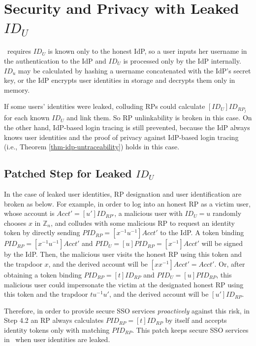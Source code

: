 \appendix

\section{Security and Privacy with Leaked $ID_U$}
\label{sp-leak-uid}
\usso\ requires $ID_U$ is known only to the honest IdP,
so a user inputs her username in the authentication to the IdP and $ID_U$ is processed only by the IdP internally.
$ID_u$ may be calculated by hashing a username concatenated with the IdP's secret key, or the IdP encrypts user identities in storage and decrypts them only in memory.

If some users' identities were leaked,
    colluding RPs could calculate $[ID_U]ID_{RP_j}$ for each known $ID_U$ and link them.
So RP unlinkability is broken in this case.
On the other hand, IdP-based login tracing is still prevented,
    because the IdP always knows user identities and the proof of privacy against IdP-based login tracing (i.e., Theorem \ref{thm-idp-untraceability}) holds in this case.

\subsection{Patched Step for Leaked $ID_U$}
In the case of leaked user identities,
RP designation and user identification are broken as below.
For example, in order to log into an honest RP as a victim user, whose account is $Acct' = [u']ID_{RP'}$,
    a malicious user with $ID_U = u$ randomly chooses $x$ in $\mathbb{Z}_n$,
    and colludes with some malicious RP to request an identity token by directly sending $PID_{RP} = [x^{-1}u^{-1}]Acct'$ to the IdP.
A token binding $PID_{RP} = [x^{-1}u^{-1}]Acct'$ and $PID_U = [u]PID_{RP} = [x^{-1}]Acct'$ will be signed by the IdP.
Then, the malicious user visits the honest RP using this token and the trapdoor $x$,
    and the derived account will be $[xx^{-1}]Acct'=Acct'$.
Or, after obtaining a token binding $PID_{RP} = [t]ID_{RP}$ and $PID_U = [u]PID_{RP}$,
    this malicious user could impersonate the victim at the designated honest RP
     using this token and the trapdoor $tu^{-1}u'$, and the derived account will be $[u']ID_{RP}$.

Therefore, in order to provide secure SSO services \emph{proactively} against this risk,
     in Step 4.2 an RP always calculates $PID_{RP} = [t]ID_{RP}$ by itself and
        accepts identity tokens only with matching $PID_{RP}$.
This patch keeps secure SSO services in \usso\ when user identities are leaked.

